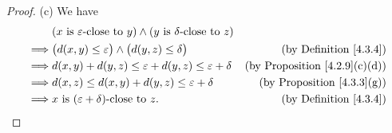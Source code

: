\begin{proof}{(c)}
    We have
    \begin{align*}
                 & (x \text{ is \(\varepsilon\)-close to } y) \land (y \text{ is \(\delta\)-close to } z)                                             \\
        \implies & \big(d(x, y) \leq \varepsilon\big) \land \big(d(y, z) \leq \delta\big)                 & \text{(by Definition \ref{4.3.4})}        \\
        \implies & d(x, y) + d(y, z) \leq \varepsilon + d(y, z) \leq \varepsilon + \delta                 & \text{(by Proposition \ref{4.2.9}(c)(d))} \\
        \implies & d(x, z) \leq d(x, y) + d(y, z) \leq \varepsilon + \delta                               & \text{(by Proposition \ref{4.3.3}(g))}    \\
        \implies & x \text{ is \((\varepsilon + \delta)\)-close to } z.                                   & \text{(by Definition \ref{4.3.4})}
    \end{align*}
\end{proof}

